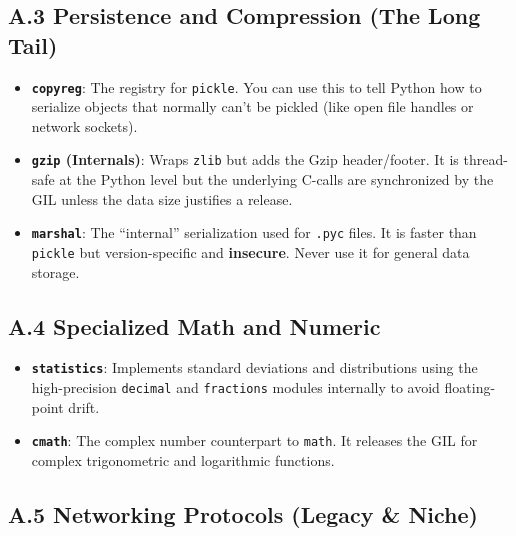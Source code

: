 \hypertarget{a.3-persistence-and-compression-the-long-tail}{%
\subsection{A.3 Persistence and Compression (The Long
Tail)}\label{a.3-persistence-and-compression-the-long-tail}}

\begin{itemize}
\tightlist
\item
  \textbf{\passthrough{\lstinline!copyreg!}}: The registry for
  \passthrough{\lstinline!pickle!}. You can use this to tell Python how
  to serialize objects that normally can't be pickled (like open file
  handles or network sockets).
\item
  \textbf{\passthrough{\lstinline!gzip!} (Internals)}: Wraps
  \passthrough{\lstinline!zlib!} but adds the Gzip header/footer. It is
  thread-safe at the Python level but the underlying C-calls are
  synchronized by the GIL unless the data size justifies a release.
\item
  \textbf{\passthrough{\lstinline!marshal!}}: The ``internal''
  serialization used for \passthrough{\lstinline!.pyc!} files. It is
  faster than \passthrough{\lstinline!pickle!} but version-specific and
  \textbf{insecure}. Never use it for general data storage.
\end{itemize}

\hypertarget{a.4-specialized-math-and-numeric}{%
\subsection{A.4 Specialized Math and
Numeric}\label{a.4-specialized-math-and-numeric}}

\begin{itemize}
\tightlist
\item
  \textbf{\passthrough{\lstinline!statistics!}}: Implements standard
  deviations and distributions using the high-precision
  \passthrough{\lstinline!decimal!} and
  \passthrough{\lstinline!fractions!} modules internally to avoid
  floating-point drift.
\item
  \textbf{\passthrough{\lstinline!cmath!}}: The complex number
  counterpart to \passthrough{\lstinline!math!}. It releases the GIL for
  complex trigonometric and logarithmic functions.
\end{itemize}

\hypertarget{a.5-networking-protocols-legacy-niche}{%
\subsection{A.5 Networking Protocols (Legacy \&
Niche)}\label{a.5-networking-protocols-legacy-niche}}

